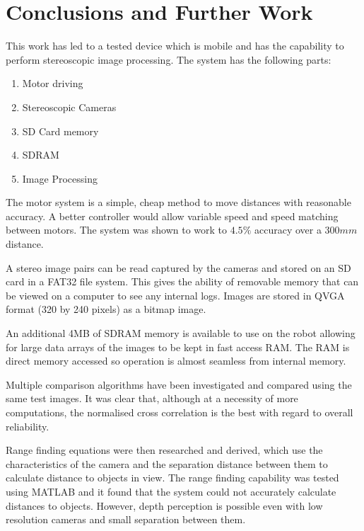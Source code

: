 \chapter{Conclusions and Further Work} \label{Chapter: Conclusions}

This work has led to a tested device which is mobile and has the capability to perform stereoscopic image processing. The system has the following parts:

\begin{enumerate}
\item Motor driving
\item Stereoscopic Cameras
\item SD Card memory
\item SDRAM
\item Image Processing
\end{enumerate} 

The motor system is a simple, cheap method to move distances with reasonable accuracy. A better controller would allow variable speed and speed matching between motors. The system was shown to work to $4.5\%$ accuracy over a $300mm$ distance.

A stereo image pairs can be read captured by the cameras and stored on an SD card in a FAT32 file system. This gives the ability of removable memory that can be viewed on a computer to see any internal logs. Images are stored in QVGA format (320 by 240 pixels) as a bitmap image. 

An additional 4MB of SDRAM memory is available to use on the robot allowing for large data arrays of the images to be kept in fast access RAM. The RAM is direct memory accessed so operation is almost seamless from internal memory.

Multiple comparison algorithms have been investigated and compared using the same test images. It was clear that, although at a necessity of more computations, the normalised cross correlation is the best with regard to overall reliability. 

Range finding equations were then researched and derived, which use the characteristics of the camera and the separation distance between them to calculate distance to objects in view. The range finding capability was tested using MATLAB and it found that the system could not accurately calculate distances to objects. However, depth perception is possible even with low resolution cameras and small separation between them.

